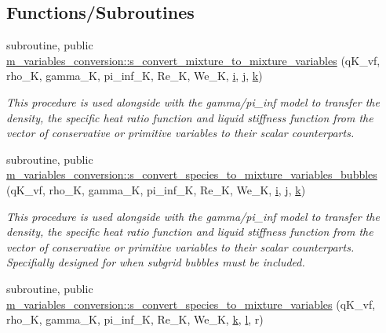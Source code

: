 \subsection*{Functions/\+Subroutines}
\begin{DoxyCompactItemize}
\item 
subroutine, public \hyperlink{namespacem__variables__conversion_a613c09e8438e535e8c13f15282493793}{m\+\_\+variables\+\_\+conversion\+::s\+\_\+convert\+\_\+mixture\+\_\+to\+\_\+mixture\+\_\+variables} (q\+K\+\_\+vf, rho\+\_\+K, gamma\+\_\+K, pi\+\_\+inf\+\_\+K, Re\+\_\+K, We\+\_\+K, \hyperlink{m__rhs_8f90_aaea4baed8fd8b780f6938f0dc1fb0f72}{i}, \hyperlink{m__rhs_8f90_aeadbc0ce9b66517f8fde156199772ec1}{j}, \hyperlink{m__rhs_8f90_af22c486581933c52df7d4aa306382074}{k})
\begin{DoxyCompactList}\small\item\em This procedure is used alongside with the gamma/pi\+\_\+inf model to transfer the density, the specific heat ratio function and liquid stiffness function from the vector of conservative or primitive variables to their scalar counterparts. \end{DoxyCompactList}\item 
subroutine, public \hyperlink{namespacem__variables__conversion_abe0d038aac3b3f0166c1a0c93c497e33}{m\+\_\+variables\+\_\+conversion\+::s\+\_\+convert\+\_\+species\+\_\+to\+\_\+mixture\+\_\+variables\+\_\+bubbles} (q\+K\+\_\+vf, rho\+\_\+K, gamma\+\_\+K, pi\+\_\+inf\+\_\+K, Re\+\_\+K, We\+\_\+K, \hyperlink{m__rhs_8f90_aaea4baed8fd8b780f6938f0dc1fb0f72}{i}, \hyperlink{m__rhs_8f90_aeadbc0ce9b66517f8fde156199772ec1}{j}, \hyperlink{m__rhs_8f90_af22c486581933c52df7d4aa306382074}{k})
\begin{DoxyCompactList}\small\item\em This procedure is used alongside with the gamma/pi\+\_\+inf model to transfer the density, the specific heat ratio function and liquid stiffness function from the vector of conservative or primitive variables to their scalar counterparts. Specifially designed for when subgrid bubbles must be included. \end{DoxyCompactList}\item 
subroutine, public \hyperlink{namespacem__variables__conversion_a0670171466cd1ce584495face34cc4de}{m\+\_\+variables\+\_\+conversion\+::s\+\_\+convert\+\_\+species\+\_\+to\+\_\+mixture\+\_\+variables} (q\+K\+\_\+vf, rho\+\_\+K, gamma\+\_\+K, pi\+\_\+inf\+\_\+K, Re\+\_\+K, We\+\_\+K, \hyperlink{m__rhs_8f90_af22c486581933c52df7d4aa306382074}{k}, \hyperlink{m__rhs_8f90_a2ac747380de0e6e5e11b01f4137fb75c}{l}, r)

\end{DoxyCompactItemize}
